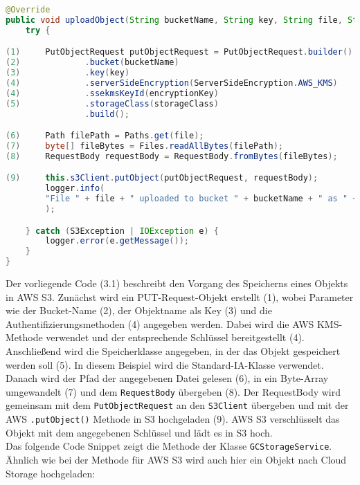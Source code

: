 \begin{lstlisting}[language=Java, caption=Prototyp Code Snippet - Hochladen eines Objekts nach S3]
@Override
public void uploadObject(String bucketName, String key, String file, String encryptionKey, String storageClass) {
    try {

(1)     PutObjectRequest putObjectRequest = PutObjectRequest.builder()
(2)             .bucket(bucketName)
(3)             .key(key)
(4)             .serverSideEncryption(ServerSideEncryption.AWS_KMS)
(4)             .ssekmsKeyId(encryptionKey)
(5)             .storageClass(storageClass)
                .build();

(6)     Path filePath = Paths.get(file);
(7)     byte[] fileBytes = Files.readAllBytes(filePath);
(8)     RequestBody requestBody = RequestBody.fromBytes(fileBytes);

(9)     this.s3Client.putObject(putObjectRequest, requestBody);
        logger.info(
        "File " + file + " uploaded to bucket " + bucketName + " as " + key
        );

    } catch (S3Exception | IOException e) {
        logger.error(e.getMessage());
    }
}
\end{lstlisting}

\newpage

Der vorliegende Code (3.1) beschreibt den Vorgang des Speicherns eines Objekts in AWS S3. Zunächst wird ein PUT-Request-Objekt erstellt (1), wobei Parameter wie der Bucket-Name (2), der Objektname als Key (3) und die Authentifizierungsmethoden (4) angegeben werden. Dabei wird die AWS KMS-Methode verwendet und der entsprechende Schlüssel bereitgestellt (4). Anschließend wird die Speicherklasse angegeben, in der das Objekt gespeichert werden soll (5). In diesem Beispiel wird die Standard-IA-Klasse verwendet. Danach wird der Pfad der angegebenen Datei gelesen (6), in ein Byte-Array umgewandelt (7) und dem \verb|RequestBody| übergeben (8). Der RequestBody wird gemeinsam mit dem \verb|PutObjectRequest| an den \verb|S3Client| übergeben und mit der AWS \verb|.putObject()| Methode in S3 hochgeladen (9). AWS S3 verschlüsselt das Objekt mit dem angegebenen Schlüssel und lädt es in S3 hoch.\\

Das folgende Code Snippet zeigt die Methode der Klasse \verb|GCStorageService|. Ähnlich wie bei der Methode für AWS S3 wird auch hier ein Objekt nach Cloud Storage hochgeladen:

